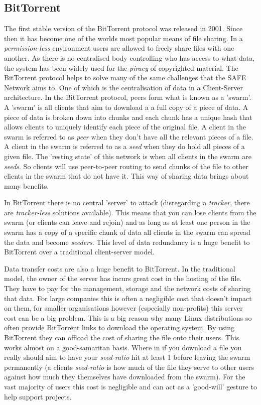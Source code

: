 \documentclass{l4proj}
\begin{document}
\subsection{BitTorrent}

The first stable version of the BitTorrent protocol was released in 2001. Since then it has become one of the worlds most popular means of file sharing. In a \textit{permission-less} environment users are allowed to freely share files with one another. As there is no centralised body controlling who has access to what data, the system has been widely used for the \textit{piracy} of copyrighted material. The BitTorrent protocol helps to solve many of the same challenges that the SAFE Network aims to. One of which is the centralisation of data in a Client-Server architecture. In the BitTorrent protocol, peers form what is known as a 'swarm'. A 'swarm' is all clients that aim to download a a full copy of a piece of data. A piece of data is broken down into chunks and each chunk has a unique hash that allows clients to uniquely identify each piece of the original file. A client in the swarm is referred to as \textit{peer} when they don't have all the relevant pieces of a file. A client in the swarm is referred to as a \textit{seed} when they do hold all pieces of a given file. The 'resting state' of this network is when all clients in the swarm are \textit{seeds}. So clients will use peer-to-peer routing to send chunks of the file to other clients in the swarm that do not have it. This way of sharing data brings about many benefits. 

In BitTorrent there is no central 'server' to attack (disregarding a \textit{tracker}, there are \textit{tracker-less} solutions available). This means that you can lose clients from the swarm (or clients can leave and rejoin) and as long as at least one person in the swarm has a copy of a specific chunk of data all clients in the swarm can spread the data and become \textit{seeders}. This level of data redundancy is a huge benefit to BitTorrent over a traditional client-server model.

Data transfer costs are also a huge benefit to BitTorrent. In the traditional model, the owner of the server has incurs great cost in the hosting of the file. They have to pay for the management, storage and the network costs of sharing that data. For large companies this is often a negligible cost that doesn't impact on them, for smaller organisations however (especially non-profits) this server cost can be a big problem. This is a big reason why many Linux distributions so often provide BitTorrent links to download the operating system. By using BitTorrent they can offload the cost of sharing the file onto their users. This works almost on a good-samaritan basis. Where in if you download a file you really should aim to have your \textit{seed-ratio} hit at least 1 before leaving the swarm permanently (a clients \textit{seed-ratio} is how much of the file they serve to other users against how much they themselves have downloaded from the swarm). For the vast majority of users this cost is negligible and can act as a 'good-will' gesture to help support projects.
\end{document}
